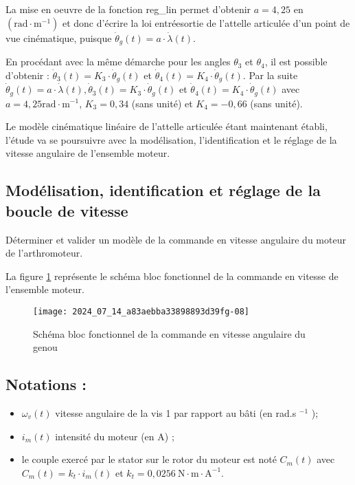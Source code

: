 
La mise en oeuvre de la fonction reg\_lin permet d'obtenir $a=4,25$ en $\left(\mathrm{rad} \cdot \mathrm{m}^{-1}\right)$ et donc d'écrire la loi entréesortie de l'attelle articulée d'un point de vue cinématique, puisque $\dot{\theta}_{g}(t)=a \cdot \dot{\lambda}(t)$.

En procédant avec la même démarche pour les angles $\theta_{3}$ et $\theta_{4}$, il est possible d'obtenir : $\dot{\theta}_{3}(t)=K_{3} \cdot \dot{\theta}_{g}(t)$ et $\dot{\theta}_{4}(t)=K_{4} \cdot \dot{\theta}_{g}(t)$. Par la suite $\dot{\theta}_{g}(t)=a \cdot \dot{\lambda}(t), \dot{\theta}_{3}(t)=K_{3} \cdot \dot{\theta}_{g}(t)$ et $\dot{\theta}_{4}(t)=K_{4} \cdot \dot{\theta}_{g}(t)$ avec $a=4,25 \mathrm{rad} \cdot \mathrm{m}^{-1}$, $K_{3}=0,34$ (sans unité) et $K_{4}=-0,66$ (sans unité).

Le modèle cinématique linéaire de l'attelle articulée étant maintenant établi, l'étude va se poursuivre avec la modélisation, l'identification et le réglage de la vitesse angulaire de l'ensemble moteur.

\subsection{Modélisation, identification et réglage de la boucle de vitesse}
\begin{obj}
Déterminer et valider un modèle de la commande en vitesse angulaire du moteur de l'arthromoteur.
\end{obj}

La figure \ref{fig:ccs_mp_2024:fig:12} représente le schéma bloc fonctionnel de la commande en vitesse de l'ensemble moteur.

\begin{figure}[!h]\centering
\texttt{[image: 2024\_07\_14\_a83aebba33898893d39fg-08]}
\caption{\label{fig:ccs_mp_2024:fig:12}Schéma bloc fonctionnel de la commande en vitesse angulaire du genou}
\end{figure}
\subsection*{Notations :}
\begin{itemize}
  \item $\omega_{v}(t)$ vitesse angulaire de la vis 1 par rapport au bâti (en rad.s ${ }^{-1}$ );

  \item $i_{m}(t)$ intensité du moteur (en A) ;

  \item le couple exercé par le stator sur le rotor du moteur est noté $C_{m}(t)$ avec $C_{m}(t)=k_{t} \cdot i_{m}(t)$ et $k_{t}=0,0256 \mathrm{~N} \cdot \mathrm{m} \cdot \mathrm{A}^{-1}$.

\end{itemize}

